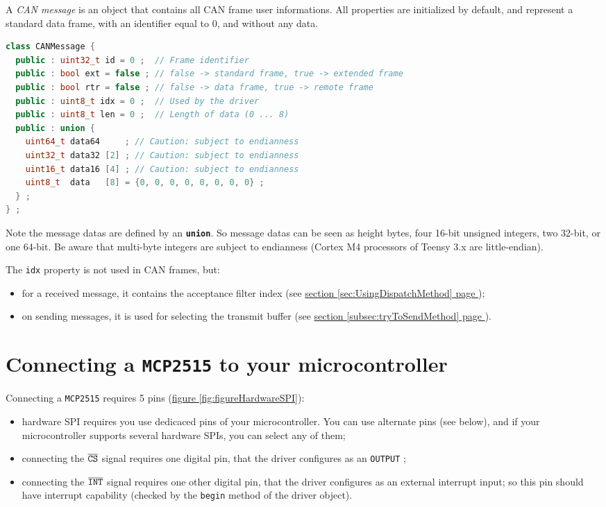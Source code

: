 \documentclass[10pt, a4paper, obeyspaces]{extarticle}
\newcommand\refSectionPage[1]{\hyperref[sec:#1]{section \ref*{sec:#1} page \pageref{sec:#1}}}
\newcommand\refSubsectionPage[1]{\hyperref[subsec:#1]{section \ref*{subsec:#1} page \pageref{subsec:#1}}}
\newcommand\refFigure[2]{\hyperref[fig:#2]{figure \ref*{fig:#2}{\ifthenelse{\equal{#1}{}}{}{.#1}}}}
\begin{document}
A \emph{CAN message} is an object that contains all CAN frame user informations. All properties are initialized by default, and represent a standard data frame, with an identifier equal to $0$, and without any data.

{ \small\begin{lstlisting}[language=c++]
class CANMessage {
  public : uint32_t id = 0 ;  // Frame identifier
  public : bool ext = false ; // false -> standard frame, true -> extended frame
  public : bool rtr = false ; // false -> data frame, true -> remote frame
  public : uint8_t idx = 0 ;  // Used by the driver
  public : uint8_t len = 0 ;  // Length of data (0 ... 8)
  public : union {
    uint64_t data64     ; // Caution: subject to endianness
    uint32_t data32 [2] ; // Caution: subject to endianness
    uint16_t data16 [4] ; // Caution: subject to endianness
    uint8_t  data   [8] = {0, 0, 0, 0, 0, 0, 0, 0} ;
  } ;
} ;
\end{lstlisting}}

Note the message datas are defined by an {\bf\texttt{union}}. So message datas can be seen as height bytes, four 16-bit unsigned integers, two 32-bit, or one 64-bit. Be aware that multi-byte integers are subject to endianness (Cortex M4 processors of Teensy 3.x are little-endian).

The \texttt{idx} property is not used in CAN frames, but:
\begin{itemize}
  \item for a received message, it contains the acceptance filter index (see \refSectionPage{UsingDispatchMethod});
  \item on sending messages, it is used for selecting the transmit buffer (see \refSubsectionPage{tryToSendMethod}).
\end{itemize}









\section{Connecting a \texttt{MCP2515} to your microcontroller}


Connecting a \texttt{MCP2515} requires 5 pins (\refFigure{}{figureHardwareSPI}):
\begin{itemize}
  \item hardware SPI requires you use dedicaced pins of your microcontroller. You can use alternate pins (see below), and if your microcontroller supports several hardware SPIs, you can select any of them;
  \item connecting the $\overline{\tt CS}$ signal requires one digital pin, that the driver configures as an \texttt{OUTPUT} ;
  \item connecting the $\overline{\tt INT}$ signal requires one other digital pin, that the driver configures as an external interrupt input; so this pin should have interrupt capability (checked by the \texttt{begin} method of the driver object).
\end{itemize}
\end{document}
